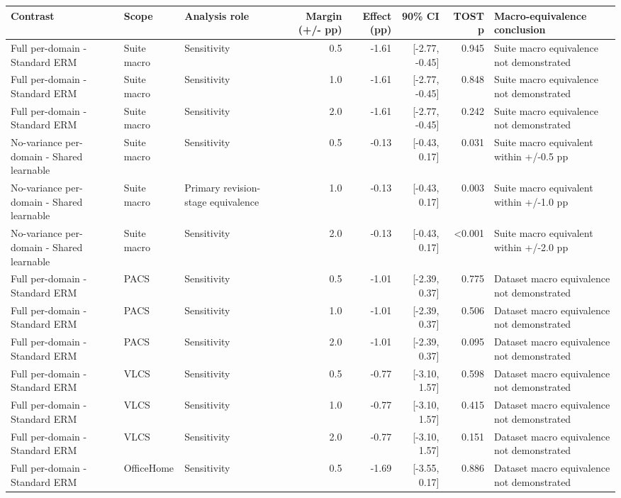 \begin{tabular}{llp{2.8cm}rrrrp{4.0cm}}
\toprule
Contrast & Scope & Analysis role & Margin (+/- pp) & Effect (pp) & 90\% CI & TOST p & Macro-equivalence conclusion \\
\midrule
Full per-domain - Standard ERM & Suite macro & Sensitivity & 0.5 & -1.61 & [-2.77, -0.45] & 0.945 & Suite macro equivalence not demonstrated \\
Full per-domain - Standard ERM & Suite macro & Sensitivity & 1.0 & -1.61 & [-2.77, -0.45] & 0.848 & Suite macro equivalence not demonstrated \\
Full per-domain - Standard ERM & Suite macro & Sensitivity & 2.0 & -1.61 & [-2.77, -0.45] & 0.242 & Suite macro equivalence not demonstrated \\
No-variance per-domain - Shared learnable & Suite macro & Sensitivity & 0.5 & -0.13 & [-0.43, 0.17] & 0.031 & Suite macro equivalent within +/-0.5 pp \\
No-variance per-domain - Shared learnable & Suite macro & Primary revision-stage equivalence & 1.0 & -0.13 & [-0.43, 0.17] & 0.003 & Suite macro equivalent within +/-1.0 pp \\
No-variance per-domain - Shared learnable & Suite macro & Sensitivity & 2.0 & -0.13 & [-0.43, 0.17] & <0.001 & Suite macro equivalent within +/-2.0 pp \\
Full per-domain - Standard ERM & PACS & Sensitivity & 0.5 & -1.01 & [-2.39, 0.37] & 0.775 & Dataset macro equivalence not demonstrated \\
Full per-domain - Standard ERM & PACS & Sensitivity & 1.0 & -1.01 & [-2.39, 0.37] & 0.506 & Dataset macro equivalence not demonstrated \\
Full per-domain - Standard ERM & PACS & Sensitivity & 2.0 & -1.01 & [-2.39, 0.37] & 0.095 & Dataset macro equivalence not demonstrated \\
Full per-domain - Standard ERM & VLCS & Sensitivity & 0.5 & -0.77 & [-3.10, 1.57] & 0.598 & Dataset macro equivalence not demonstrated \\
Full per-domain - Standard ERM & VLCS & Sensitivity & 1.0 & -0.77 & [-3.10, 1.57] & 0.415 & Dataset macro equivalence not demonstrated \\
Full per-domain - Standard ERM & VLCS & Sensitivity & 2.0 & -0.77 & [-3.10, 1.57] & 0.151 & Dataset macro equivalence not demonstrated \\
Full per-domain - Standard ERM & OfficeHome & Sensitivity & 0.5 & -1.69 & [-3.55, 0.17] & 0.886 & Dataset macro equivalence not demonstrated \\

\end{tabular}

